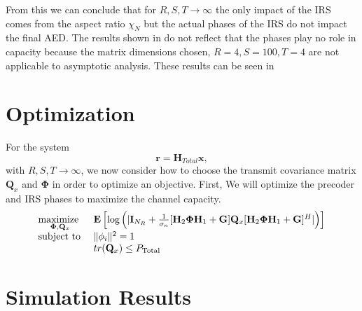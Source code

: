 \documentclass[12pt,a4paper]{report}
\begin{document}
From this we can conclude that for $R,S,T \rightarrow \infty $ the only impact of the IRS comes from the aspect ratio
$\chi_N$ but the actual phases of the IRS do not impact the final AED.
The results shown in \cite{zhang2019capacity} do not reflect that the phases play no role in capacity because 
the matrix dimensions chosen, $R = 4, S = 100 , T = 4$ are not applicable to asymptotic analysis. 
These results can be seen in 
\section{Optimization}
For the system
\begin{equation}
		\mathbf{r} = \mathbf{H}_{Total}\mathbf{x},
	\end{equation}
	with  $R,S,T \rightarrow \infty $,
we now consider
how to choose the transmit covariance matrix $\mathbf{Q}_x$ and $\boldsymbol{\Phi}$ in order to optimize an objective.
First, We will optimize the precoder and IRS phases to maximize the channel capacity.
		    \begin{equation}
    \begin{array}{ll}
    \underset{\boldsymbol{\Phi}, \mathbf{Q}_x}{\text{maximize }}   & \mathop{\bf E{}}\left[\text{log{}}\left(|\mathbf{I}_{N_R}+\frac{1}{\sigma_n}[\mathbf{H}_{2}\boldsymbol{\Phi}\mathbf{H}_{1} + \mathbf{G}]\mathbf{Q}_x[\mathbf{H}_{2}\boldsymbol{\Phi}\mathbf{H}_{1} + \mathbf{G}]^H|\right)\right]
    \\
    \mbox{subject to } & \|\phi_i\|^2 = 1
    \\
    & tr(\mathbf{Q}_x) \leq P_{\text{Total}}
    \end{array}
    \label{general_irs_opt}
    \end{equation} 
    
    

\section{Simulation Results}
\end{document}
